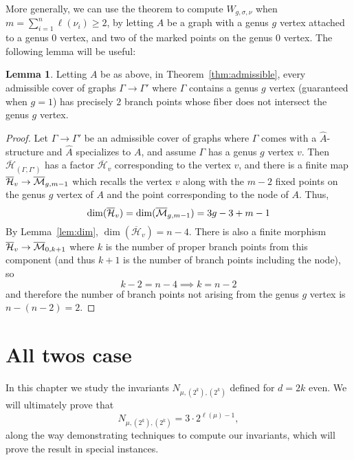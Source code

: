 \documentclass[thesis]{thesis-umich}           %
\newcommand{\Hb}{\overline{\mathcal H}}
\theoremstyle{definition}
\newtheorem{lem}[thm]{Lemma}
\begin{document}
                More generally, we can use the theorem to compute $W_{g,\sigma,\nu}$ when $m=\sum\limits_{i=1}^n\ell(\nu_i)\geq 2$, by letting $A$ be a graph with a genus $g$ vertex attached to a genus $0$ vertex, and two of the
                marked points on the genus $0$ vertex. The following lemma will be useful:

                \begin{lem}
                  \label{lem:branchpoints}
                  Letting $A$ be as above, in Theorem~\ref{thm:admissible}, every admissible cover of graphs $\Gamma\to\Gamma'$ where $\Gamma$ contains a genus $g$ vertex (guaranteed when $g=1$) has precisely $2$ branch points
                  whose fiber does not intersect the genus $g$ vertex.
                \end{lem}

                \begin{proof}
                  Let $\Gamma\to\Gamma'$ be an admissible cover of graphs where $\Gamma$ comes with a $\hat A$-structure and $\hat A$ specializes to $A$, and assume $\Gamma$ has a genus $g$ vertex $v$.
                  Then $\Hb_{(\Gamma,\Gamma')}$ has a factor $\Hb_{v}$ corresponding to the vertex $v$,
                  and there is a finite map $\Hb_{v}\to\mb_{g,m-1}$ which recalls
                  the vertex $v$ along with the $m-2$ fixed points on the genus $g$ vertex of $A$ and
                  the point corresponding to the node of $A$. Thus,
                  \[
                  \dim(\Hb_v)=\dim(\mb_{g,m-1})=3g-3+m-1
                  \]
                  By Lemma~\ref{lem:dim}, $\dim(\Hb_v)=n-4$. There is also a finite morphism
                  $\Hb_v\to\mb_{0,k+1}$ where $k$ is the number of proper branch points from this
                  component (and thus $k+1$ is the number of branch points including the node), so
                  \[
                  k-2=n-4\implies k=n-2
                  \]
                  and therefore the number of branch points not arising from the genus $g$ vertex is $n-(n-2)=2$.
                  \end{proof}


\chapter{All twos case}

In this chapter we study the invariants $N_{\mu,(2^k),(2^k)}$ defined for $d=2k$ even.
We will ultimately prove that
\[
N_{\mu,(2^k),(2^k)}=3\cdot 2^{\ell(\mu)-1},
\]
along the way demonstrating techniques to compute our invariants, which will prove the result in special instances.
\end{document}
